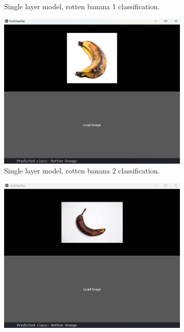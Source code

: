 \documentclass[conference]{IEEEtran}
\begin{document}
\begin{figure}[h]
\begin{subfigure}[b]{0.48\linewidth}
        \caption{Single layer model, rotten banana 1 classification.}
        \label{figFA}
    \end{subfigure}
    \hfill
    \begin{subfigure}[b]{0.48\linewidth}
        \centering
        \includegraphics[width=\linewidth]{1layer bananaR2.png}
        \caption{Single layer model, rotten banana 2 classification.}
        \label{figFB}
    \end{subfigure}
    \hfill
    \begin{subfigure}[b]{0.48\linewidth}
        \centering
        \includegraphics[width=\linewidth]{1layer bananaR3.png}

\end{subfigure}
\end{figure}
\end{document}
